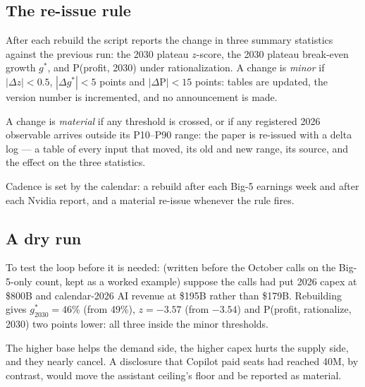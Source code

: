 \documentclass[11pt,letterpaper]{article}
\begin{document}
\subsection*{The re-issue rule}
After each rebuild the script reports the change in three summary statistics against the previous run: the 2030 plateau $z$-score, the 2030 plateau break-even growth $g^{*}$, and P(profit, 2030) under rationalization. A change is \emph{minor} if $|\Delta z|<0.5$, $|\Delta g^{*}|<5$ points and $|\Delta\text{P}|<15$ points: tables are updated, the version number is incremented, and no announcement is made.

A change is \emph{material} if any threshold is crossed, or if any registered 2026 observable arrives outside its P10--P90 range: the paper is re-issued with a delta log --- a table of every input that moved, its old and new range, its source, and the effect on the three statistics.

Cadence is set by the calendar: a rebuild after each Big-5 earnings week and after each Nvidia report, and a material re-issue whenever the rule fires.

\subsection*{A dry run}
To test the loop before it is needed: (written before the October calls on the Big-5-only count, kept as a worked example) suppose the calls had put 2026 capex at \$800B and calendar-2026 AI revenue at \$195B rather than \$179B. Rebuilding gives $g^{*}_{2030}=46\%$ (from 49\%), $z=-3.57$ (from $-3.54$) and P(profit, rationalize, 2030) two points lower: all three inside the minor thresholds.

The higher base helps the demand side, the higher capex hurts the supply side, and they nearly cancel. A disclosure that Copilot paid seats had reached 40M, by contrast, would move the assistant ceiling's floor and be reported as material.
\end{document}
